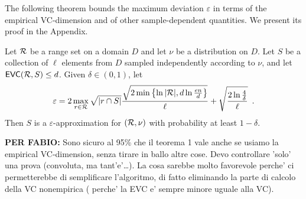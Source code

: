 
The following theorem bounds the maximum deviation $\varepsilon$ in terms of
the empirical VC-dimension and of other sample-dependent quantities. We present
its proof in the Appendix.

\begin{theorem}\label{thm:eapproxempir}
	Let $\mathcal{R}$ be a range set on a domain $D$ and let $\nu$ be a distribution
	on $D$. Let $S$ be a collection of $\ell$ elements from $D$ sampled
	independently according to $\nu$, and let $\mathsf{EVC}(\mathcal{R},S)\le d$. Given
	$\delta\in(0,1)$, let
	\begin{equation}\label{eq:evceapprox}
		\varepsilon = 2\max_{r\in\mathcal{R}}\sqrt{|r\cap
		S|}\frac{\sqrt{2\min\left\{\ln|\mathcal{R}|,d\ln\frac{en}{d}\right\}}}{\ell} +
		\sqrt{\frac{2\ln\frac{4}{\delta}}{\ell}}\enspace.
	\end{equation}
	Then $S$ is a $\varepsilon$-approximation for $(\mathcal{R},\nu)$ with
	probability at least $1-\delta$.
\end{theorem}

{\bf PER FABIO: } Sono sicuro al 95\% che il teorema 1 vale anche se usiamo la
empirical VC-dimension, senza tirare in ballo altre cose. Devo controllare
'solo' una prova (convoluta, ma tant'e'\ldots). La cosa sarebbe molto favorevole
perche' ci permetterebbe di semplificare l'algoritmo, di fatto eliminando la
parte di calcolo della VC nonempirica ( perche' la EVC e' sempre minore uguale
alla VC).

